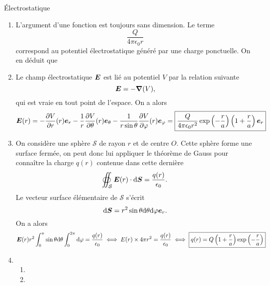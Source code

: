 \begin{corr}{Électrostatique}
\begin{enumerate}
	\item L'argument d'une fonction est toujours sans dimension.  Le terme 
	  \begin{equation*}
	  	\dfrac{Q}{4 \pi \epsilon_0 r}
	 \end{equation*}
	  correspond au potentiel électrostatique généré par une charge ponctuelle.
	  On en déduit que 

  	\item Le champ électrostatique $\vece$ est lié au potentiel $V$ par la
          relation suivante
	  \begin{equation*}
		  \vece = - \grad(V),
	  \end{equation*}
	  qui est vraie en tout point de l'espace. On a alors
	  \begin{equation*}
		  \vece(r) = - \dd{V}{r}(r)\er -\dfrac{1}{r}\dd{V}{\theta}(r)\etheta
		  -\dfrac{1}{r\sin\theta}\dd{V}{\phi}(r)\ephi
		  = \boxed{\dfrac{Q}{4 \pi \epsilon_0 r^2}\exp\left(-\dfrac{r}{a}
		    \right)\left(1 + \dfrac{r}{a}\right)\er}
	  \end{equation*}

  	\item On considère une sphère $\mathcal{S}$ de rayon $r$ et de centre $O$.
	  Cette sphère forme une surface fermée, on peut donc lui appliquer le
	  théorème de Gauss pour connaître la charge $q(r)$ contenue dans cette 
	  dernière
	  \begin{equation*}
		  \oiint_\mathcal{S} \vece(r) \cdot \ds = \dfrac{q(r)}{\epsilon_0}.
	  \end{equation*}
	  Le vecteur surface élémentaire de $\mathcal{S}$ s'écrit
	  \begin{equation*}
		  \ds = r^2 \sin\theta\dtheta\dphi \er.
	  \end{equation*}
	  On a alors
	  \begin{equation*}
		  \vece(r)r^2 \int_0^\pi \sin\theta\dtheta 
		  \int_0^{2\pi} \dphi = \dfrac{q(r)}{\epsilon_0}
		  \iff E(r) \times 4 \pi r^2 = \dfrac{q(r)}{\epsilon_0}
		  \iff \boxed{q(r) = Q\left(1 + \dfrac{r}{a}\right)
			  \exp\left(-\dfrac{r}{a}\right)}
	 \end{equation*}

 	\item \begin{enumerate}
		\item {}
		\item {}
	  \end{enumerate}


\end{enumerate}
\end{corr}
